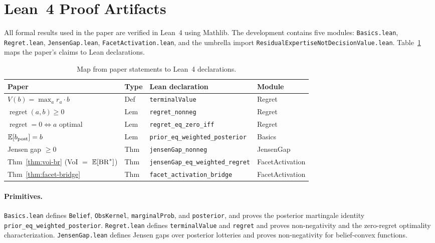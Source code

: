 \appendix

\section{Lean~4 Proof Artifacts}
\label{app:lean}

All formal results used in the paper are verified in Lean~4 using Mathlib.
The development contains five modules: \texttt{Basics.lean}, \texttt{Regret.lean}, \texttt{JensenGap.lean}, \texttt{FacetActivation.lean}, and the umbrella import \texttt{ResidualExpertiseNotDecisionValue.lean}.
Table~\ref{tab:lean-map} maps the paper's claims to Lean declarations.

\begin{table}[ht]
\centering
\caption{Map from paper statements to Lean~4 declarations.}
\label{tab:lean-map}
\small
\begin{tabular}{@{}llll@{}}
\toprule
Paper & Type & Lean declaration & Module \\
\midrule
$V(b) = \max_a r_a \cdot b$ & Def & \texttt{terminalValue} & Regret \\
$\operatorname{regret}(a,b) \geq 0$ & Lem & \texttt{regret\_nonneg} & Regret \\
$\operatorname{regret}=0 \Leftrightarrow a$ optimal & Lem & \texttt{regret\_eq\_zero\_iff} & Regret \\
$\mathbb{E}[b_{\mathrm{post}}]=b$ & Lem & \texttt{prior\_eq\_weighted\_posterior} & Basics \\
Jensen gap $\geq 0$ & Thm & \texttt{jensenGap\_nonneg} & JensenGap \\
Thm~\ref{thm:voi-br} (VoI $=$ $\mathbb{E}[\operatorname{BR}^{*}]$) & Thm & \texttt{jensenGap\_eq\_weighted\_regret} & FacetActivation \\
Thm~\ref{thm:facet-bridge} & Thm & \texttt{facet\_activation\_bridge} & FacetActivation \\
\bottomrule
\end{tabular}
\end{table}

\paragraph{Primitives.}
\texttt{Basics.lean} defines \texttt{Belief}, \texttt{ObsKernel}, \texttt{marginalProb}, and \texttt{posterior}, and proves the posterior martingale identity \texttt{prior\_eq\_weighted\_posterior}.
\texttt{Regret.lean} defines \texttt{terminalValue} and \texttt{regret} and proves non-negativity and the zero-regret optimality characterization.
\texttt{JensenGap.lean} defines Jensen gaps over posterior lotteries and proves non-negativity for belief-convex functions.

